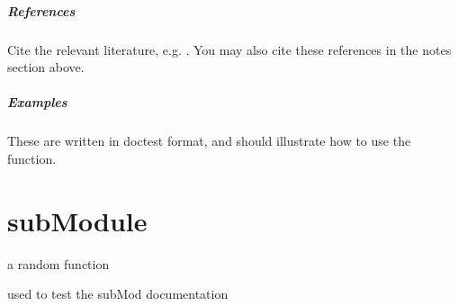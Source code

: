 \documentclass[letterpaper,10pt,english]{sphinxmanual}
\begin{document}
\begin{fulllineitems}
\paragraph{References}

Cite the relevant literature, e.g. \label{\detokenize{example:id1}}{\hyperref[\detokenize{example:rfb95ad3cf4e1-1}]{\sphinxcrossref{{[}1{]}}}}.  You may also cite these
references in the notes section above.

\label{\detokenize{example:id2}}{\hyperref[\detokenize{example:rfb95ad3cf4e1-1}]{\sphinxcrossref{{[}1{]}}}}
\paragraph{Examples}

These are written in doctest format, and should illustrate how to
use the function.

%
\begin{sphinxVerbatim}[commandchars=\\\{\}]
  \PYG{p}{[}  \PYG{p}{]}
 \PYG{p}{[}      \PYG{p}{]}
 
\end{sphinxVerbatim}

\end{fulllineitems}



\chapter{subModule}
\label{\detokenize{example:submodule}}\label{\detokenize{example:module-subMod.test}}
a random function

used to test the subMod documentation
\end{document}
